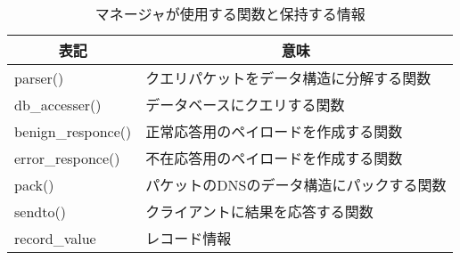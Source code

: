 \begin{table}[htbp]
 \caption{マネージャが使用する関数と保持する情報}
 \centering
  \begin{tabular}{ll}
    \toprule
		\multicolumn{1}{c}{\textbf{表記}} & \multicolumn{1}{c}{\textbf{意味}} \\
    \midrule
		parser() & クエリパケットをデータ構造に分解する関数 \\
		db\_accesser() & データベースにクエリする関数 \\
		benign\_responce() & 正常応答用のペイロードを作成する関数 \\
		error\_responce() & 不在応答用のペイロードを作成する関数 \\
		pack() & パケットのDNSのデータ構造にパックする関数 \\
		sendto() & クライアントに結果を応答する関数 \\
		record\_value & レコード情報 \\
    \bottomrule
  \end{tabular}
 \label{tab:discription-manager}
\end{table}
